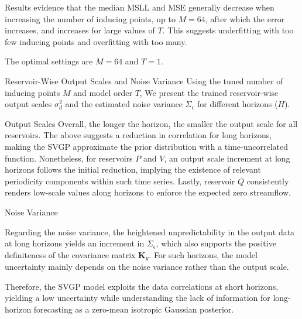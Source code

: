 \begin{frame}
	 Results evidence that the median MSLL and MSE generally decrease when increasing the number of inducing points, up to $M=64$, after which the error increases, and increases for large values of $T$. This suggests underfitting with too few inducing points and overfitting with too many.
 	\begin{figure}[htbp]
	 	\setlength{} 
	 	\setlength{}
 		\hspace{-1em}
	\end{figure}
	The optimal settings are $M=64$ and $T=1$.
\end{frame}

\begin{frame}{Reservoir-Wise Output Scales and Noise Variance}
	Using the tuned number of inducing points $M$ and model order $T$, We present the trained reservoir-wise output scales $\sigma_d^2$ and the estimated noise variance $\Sigma_\epsilon$ for different horizons ($H$).
	
	\begin{figure}[htbp]
	 	\setlength{} 
		\setlength{}
		\hspace{-1em}
	\end{figure}
\end{frame}

\begin{frame}{Output Scales}
	 Overall, the longer the horizon, the smaller the output scale for all reservoirs. The above suggests a reduction in correlation for long horizons, making the SVGP approximate the prior distribution with a time-uncorrelated function. Nonetheless, for reservoirs $P$ and $V$, an output scale increment at long horizons follows the initial reduction, implying the existence of relevant periodicity components within such time series. Lastly, reservoir $Q$ consistently renders low-scale values along horizons to enforce the expected zero streamflow. 
\end{frame}

\begin{frame}{Noise Variance}

	Regarding the noise variance, the heightened unpredictability in the output data at long horizons yields an increment in $\Sigma_\epsilon$, which also supports the positive definiteness of the covariance matrix $\mathbf{K}_y$. For such horizons, the model uncertainty mainly depends on the noise variance rather than the output scale.
	
	Therefore, the SVGP model exploits the data correlations at short horizons, yielding a low uncertainty while understanding the lack of information for long-horizon forecasting as a zero-mean isotropic Gaussian posterior. 
\end{frame}

